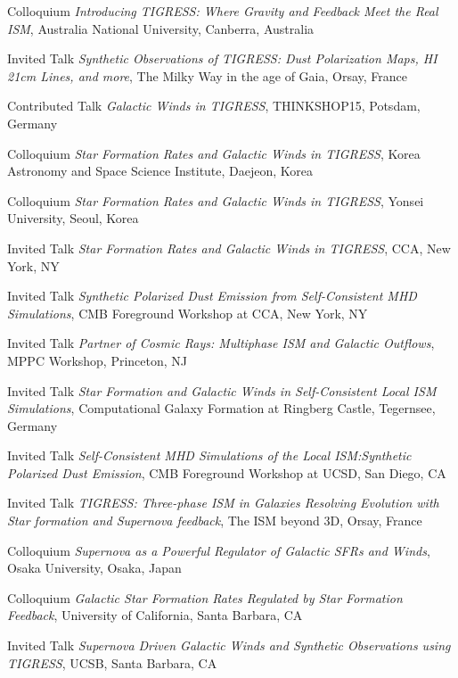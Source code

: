 \documentclass[12pt]{article}
\begin{document}
{Colloquium}
{\emph{Introducing TIGRESS: Where Gravity and Feedback Meet the Real ISM},
Australia National University,
Canberra, Australia}

{Invited Talk}
{\emph{Synthetic Observations of TIGRESS: Dust Polarization Maps, HI 21cm Lines, and more},
The Milky Way in the age of Gaia,
Orsay, France}

{Contributed Talk}
{\emph{Galactic Winds in TIGRESS},
THINKSHOP15,
Potsdam, Germany}

{Colloquium}
{\emph{Star Formation Rates and Galactic Winds in TIGRESS},
Korea Astronomy and Space Science Institute,
Daejeon, Korea}

{Colloquium}
{\emph{Star Formation Rates and Galactic Winds in TIGRESS},
Yonsei University,
Seoul, Korea}

{Invited Talk}
{\emph{Star Formation Rates and Galactic Winds in TIGRESS},
CCA,
New York, NY}

{Invited Talk}
{\emph{Synthetic Polarized Dust Emission from Self-Consistent MHD Simulations},
CMB Foreground Workshop at CCA,
New York, NY}

{Invited Talk}
{\emph{Partner of Cosmic Rays: Multiphase ISM and Galactic Outflows},
MPPC Workshop,
Princeton, NJ}

{Invited Talk}
{\emph{Star Formation and Galactic Winds in Self-Consistent Local ISM Simulations},
Computational Galaxy Formation at Ringberg Castle,
Tegernsee, Germany}

{Invited Talk}
{\emph{Self-Consistent MHD Simulations of the Local ISM:Synthetic Polarized Dust Emission},
CMB Foreground Workshop at UCSD,
San Diego, CA}

{Invited Talk}
{\emph{TIGRESS: Three-phase ISM in Galaxies Resolving Evolution with Star formation and Supernova feedback},
The ISM beyond 3D,
Orsay, France}

{Colloquium}
{\emph{Supernova as a Powerful Regulator of Galactic SFRs and Winds},
Osaka University,
Osaka, Japan}

{Colloquium}
{\emph{Galactic Star Formation Rates Regulated by Star Formation Feedback},
University of California,
Santa Barbara, CA}

{Invited Talk}
{\emph{Supernova Driven Galactic Winds and Synthetic Observations using TIGRESS},
UCSB,
Santa Barbara, CA}
\end{document}

